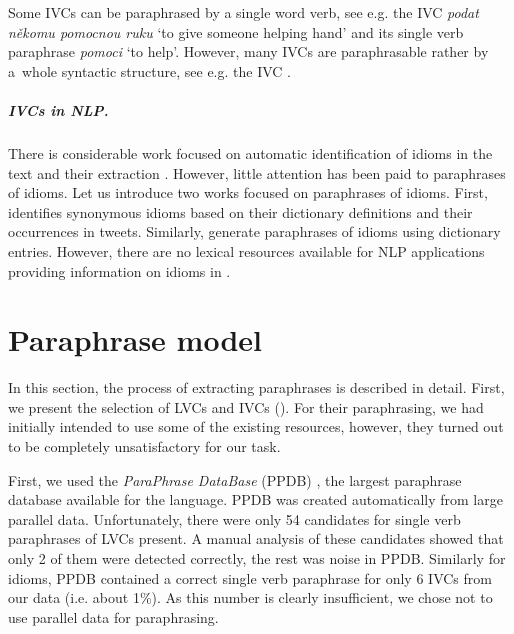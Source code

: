 \documentclass[output=paper,modfonts,nonflat]{langsci/langscibook}
\begin{document}
Some IVCs can be paraphrased by a single word verb, see e.g. the IVC 
\textit{podat někomu pomocnou ruku} `to give someone helping hand' and its 
single verb paraphrase \textit{pomoci} `to help'. However, many IVCs are 
paraphrasable rather by a~whole syntactic structure, see e.g. the IVC 
.

 \subparagraph*{IVCs in NLP.} There is considerable work focused on automatic identification
 of idioms in the text and their extraction
\citep{cook-07,li-2009,muzny2013,peng-15,Katz06automaticidentification}. 
However, little attention has been paid to paraphrases of idioms. Let us 
introduce two works focused on paraphrases of idioms. First, \citet{pershina-15} 
identifies synonymous idioms based on their dictionary definitions  and their 
occurrences in tweets. Similarly, \citet{liu2016phrasal} generate paraphrases 
of idioms using  dictionary entries. However, there are no lexical
resources available for NLP applications providing information on idioms in . 


\section{Paraphrase model}
\label{CPs}


In this section, the process of extracting paraphrases is described in detail. 
First, we present the selection of LVCs and IVCs (). For 
their paraphrasing, we had initially intended to use some of the existing 
resources, however, they turned out to be completely unsatisfactory for 
our task.

First, we used the \emph{ParaPhrase DataBase} (PPDB) \citep{ppdb}, 
the largest paraphrase database available for the  language. PPDB was 
created automatically from large parallel data. Unfortunately, there were only 
54 candidates for single verb paraphrases of LVCs present. A manual analysis of 
these candidates showed that only 2 of them were detected correctly, the 
rest was noise in PPDB. Similarly for idioms, PPDB contained a correct single 
verb paraphrase for only 6 IVCs from our data (i.e. about 1\%). As this number 
is clearly insufficient, we chose not to use parallel data for paraphrasing.
\end{document}
